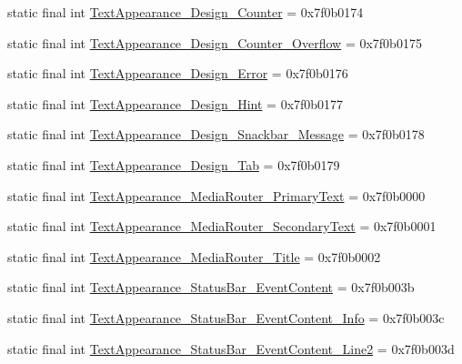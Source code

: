 \begin{CompactItemize}
\item 
static final int \hyperlink{classandroid_1_1support_1_1v7_1_1appcompat_1_1_r_1_1style_6c21bac72719f63a19c93bcd2abb6af9}{TextAppearance\_\-Design\_\-Counter} = 0x7f0b0174
\item 
static final int \hyperlink{classandroid_1_1support_1_1v7_1_1appcompat_1_1_r_1_1style_b4983713350040d6278d1a2078cafa2e}{TextAppearance\_\-Design\_\-Counter\_\-Overflow} = 0x7f0b0175
\item 
static final int \hyperlink{classandroid_1_1support_1_1v7_1_1appcompat_1_1_r_1_1style_d17ebb589b7df2d9efe57c920cd655d3}{TextAppearance\_\-Design\_\-Error} = 0x7f0b0176
\item 
static final int \hyperlink{classandroid_1_1support_1_1v7_1_1appcompat_1_1_r_1_1style_6b43e5b21562ce6b9b6145467adced2c}{TextAppearance\_\-Design\_\-Hint} = 0x7f0b0177
\item 
static final int \hyperlink{classandroid_1_1support_1_1v7_1_1appcompat_1_1_r_1_1style_906bc240a5eb8d5a23ca88cf85744ebe}{TextAppearance\_\-Design\_\-Snackbar\_\-Message} = 0x7f0b0178
\item 
static final int \hyperlink{classandroid_1_1support_1_1v7_1_1appcompat_1_1_r_1_1style_6e3076274510bea1a043ee8437556467}{TextAppearance\_\-Design\_\-Tab} = 0x7f0b0179
\item 
static final int \hyperlink{classandroid_1_1support_1_1v7_1_1appcompat_1_1_r_1_1style_fe49885ca30571012fc89b1d2636a504}{TextAppearance\_\-MediaRouter\_\-PrimaryText} = 0x7f0b0000
\item 
static final int \hyperlink{classandroid_1_1support_1_1v7_1_1appcompat_1_1_r_1_1style_a323e0f9776199c4b670cb5eee118850}{TextAppearance\_\-MediaRouter\_\-SecondaryText} = 0x7f0b0001
\item 
static final int \hyperlink{classandroid_1_1support_1_1v7_1_1appcompat_1_1_r_1_1style_f25b873eb3d59e71d500584e65e52bff}{TextAppearance\_\-MediaRouter\_\-Title} = 0x7f0b0002
\item 
static final int \hyperlink{classandroid_1_1support_1_1v7_1_1appcompat_1_1_r_1_1style_4077714485b0c9d18a1e539b4fe940db}{TextAppearance\_\-StatusBar\_\-EventContent} = 0x7f0b003b
\item 
static final int \hyperlink{classandroid_1_1support_1_1v7_1_1appcompat_1_1_r_1_1style_6c8c5a098ce77471ad9c9d7db68a32c5}{TextAppearance\_\-StatusBar\_\-EventContent\_\-Info} = 0x7f0b003c
\item 
static final int \hyperlink{classandroid_1_1support_1_1v7_1_1appcompat_1_1_r_1_1style_d480e4b69bc77953e2358e2388322657}{TextAppearance\_\-StatusBar\_\-EventContent\_\-Line2} = 0x7f0b003d

\end{CompactItemize}
